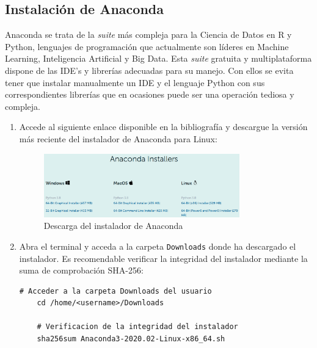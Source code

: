 \subsection{Instalación de Anaconda}
\label{subsec:instalacion-anaconda}

Anaconda se trata de la \textit{suite} más compleja para la Ciencia de Datos en R y Python, lenguajes de programación que actualmente son líderes en Machine Learning, Inteligencia Artificial y Big Data. Esta \textit{suite} gratuita y multiplataforma dispone de las IDE's y librerías adecuadas para su manejo. Con ellos se evita tener que instalar manualmente un IDE y el lenguaje Python con sus correspondientes librerías que en ocasiones puede ser una operación tediosa y compleja.

\begin{enumerate}
    \item Accede al siguiente enlace \cite{inst-conda} disponible en la bibliografía y descargue la versión más reciente del instalador de Anaconda para Linux:
    
    \begin{figure}[ht]
    \centering
    \includegraphics[width=0.8\textwidth]{img/appendix/C/anaconda-installer.png}
    \caption{\label{fig:anaconda-download}Descarga del instalador de Anaconda}
    \end{figure}

    \item Abra el terminal y acceda a la carpeta \texttt{Downloads} donde ha descargado el instalador. Es recomendable verificar la integridad del instalador mediante la suma de comprobación SHA-256:
    
    \vspace{0.5cm}
    
    \begin{lstlisting}[language=iPython,caption=Verificación de la integridad de la instalación de Anaconda,captionpos=b,label={lst:verificar-sha256}]
    # Acceder a la carpeta Downloads del usuario
    cd /home/<username>/Downloads
    
    # Verificacion de la integridad del instalador
    sha256sum Anaconda3-2020.02-Linux-x86_64.sh
    \end{lstlisting}
    

\end{enumerate}
